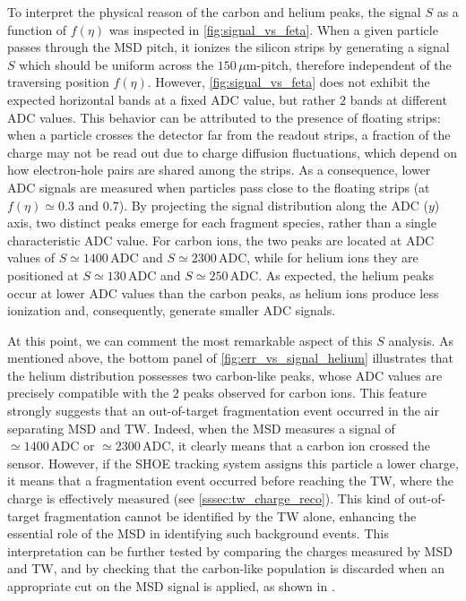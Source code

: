 To interpret the physical reason of the carbon and helium peaks, the signal $S$ as a function of $f(\eta)$ was inspected in \autoref{fig:signal_vs_feta}. When a given particle passes through the MSD pitch, it ionizes the silicon strips by generating a signal $S$ which should be uniform across the $150\,\mu\mathrm{m}$-pitch, therefore independent of the traversing position $f(\eta)$. However, \autoref{fig:signal_vs_feta} does not exhibit the expected horizontal bands at a fixed ADC value, but rather $2$ bands at different ADC values. This behavior can be attributed to the presence of floating strips: when a particle crosses the detector far from the readout strips, a fraction of the charge may not be read out due to charge diffusion fluctuations, which depend on how electron-hole pairs are shared among the strips. As a consequence, lower ADC signals are measured when particles pass close to the floating strips (at $f(\eta)\simeq0.3$ and $0.7$). By projecting the signal distribution along the ADC ($y$) axis, two distinct peaks emerge for each fragment species, rather than a single characteristic ADC value. For carbon ions, the two peaks are located at ADC values of $S\simeq1400\,\mathrm{ADC}$ and $S\simeq2300\,\mathrm{ADC}$, while for helium ions they are positioned at $S\simeq130\,\mathrm{ADC}$ and $S\simeq250\,\mathrm{ADC}$. As expected, the helium peaks occur at lower ADC values than the carbon peaks, as helium ions produce less ionization and, consequently, generate smaller ADC signals.

At this point, we can comment the most remarkable aspect of this $S$ analysis. As mentioned above, the bottom panel of \autoref{fig:err_vs_signal_helium} illustrates that the helium distribution possesses two carbon-like peaks, whose ADC values are precisely compatible with the $2$ peaks observed for carbon ions. This feature strongly suggests that an out-of-target fragmentation event occurred in the air separating MSD and TW. Indeed, when the MSD measures a signal of $\simeq1400\,\mathrm{ADC}$ or $\simeq2300\,\mathrm{ADC}$, it clearly means that a carbon ion crossed the sensor. However, if the SHOE tracking system assigns this particle a lower charge, it means that a fragmentation event occurred before reaching the TW, where the charge is effectively measured (see \autoref{sssec:tw_charge_reco}). This kind of out-of-target fragmentation cannot be identified by the TW alone, enhancing the essential role of the MSD in identifying such background events. This interpretation can be further tested by comparing the charges measured by MSD and TW, and by checking that the carbon-like population is discarded when an appropriate cut on the MSD signal is applied, as shown in \cite{amslaurea39737}.
